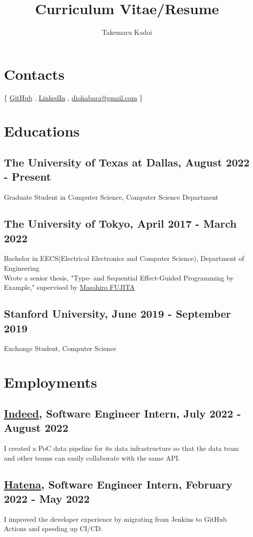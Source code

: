 \documentclass[12pt]{article}
\title{\vspace{-1cm}Curriculum Vitae/Resume}
\author{Takemaru Kadoi}
\date{}
\begin{document}

\section*{Contacts}
  \{
    \href{https://github.com/diohabara/}{GitHub}
    , \href{https://www.linkedin.com/in/takemaru-kadoi}{LinkedIn}
    , \href{mailto:diohabara@gmail.com}{diohabara@gmail.com}
  \}

\section*{Educations}
  \subsection*{The University of Texas at Dallas, August 2022 - Present}
    Graduate Student in Computer Science, Computer Science Department
  \subsection*{The University of Tokyo, April 2017 - March 2022}
    Bachelor in EECS(Electrical Electronics and Computer Science), Department of Engineering
    \\
    Wrote a senior thesis, "Type- and Sequential Effect-Guided Programming by Example," supervised by \href{https://www.cad.t.u-tokyo.ac.jp/en/}{Masahiro FUJITA}
  \subsection*{Stanford University, June 2019 - September 2019}
    Exchange Student, Computer Science

\section*{Employments}
  \subsection*{\href{https://www.indeed.com/about}{Indeed}, Software Engineer Intern, July 2022 - August 2022}
    I created a PoC data pipeline for its data infrastructure so that the data team and other teams can easily collaborate with the same API.
  \subsection*{\href{https://hatenacorp.jp/}{Hatena}, Software Engineer Intern, February 2022 - May 2022}
    I improved the developer experience by migrating from Jenkins to GitHub Actions and speeding up CI/CD.
\end{document}
